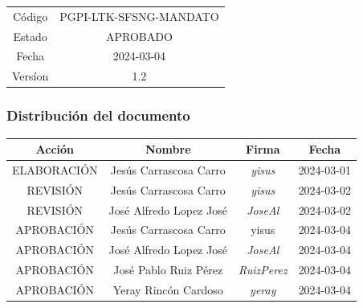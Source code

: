\documentclass[
	a4paper, %
	12pt, %
]{CSSullivanBusinessReport}
\begin{document}
\begin{twothirdswidth}
        \begin{tabular}{cc}
        \toprule
            Código& PGPI-LTK-SFSNG-MANDATO \\
             Estado& APROBADO\\
             Fecha& 2024-03-04 \\
             Versíon& 1.2\\
             \bottomrule
        \end{tabular}
       
    \subsubsection*{Distribución del documento}
        \begin{tabular}{|c|c|c|c|}
        \toprule
         \textbf{Acción} & \textbf{Nombre} &\textbf{Firma} & \textbf{Fecha}\\
         \midrule
         ELABORACIÓN & Jesús Carrascosa Carro & \textit{yisus }& 2024-03-01\\
         \midrule
         REVISIÓN & Jesús Carrascosa Carro & \textit{yisus} & 2024-03-02\\
         REVISIÓN & José Alfredo Lopez José & \textit{JoseAl} & 2024-03-02\\
         \midrule
         APROBACIÓN & Jesús Carrascosa Carro & yisus & 2024-03-04\\
         APROBACIÓN & José Alfredo Lopez José & \textit{JoseAl} & 2024-03-04\\
         APROBACIÓN & José Pablo Ruiz Pérez & \textit{RuizPerez} & 2024-03-04\\
         APROBACIÓN & Yeray Rincón Cardoso & \textit{yeray} & 2024-03-04\\
         \bottomrule
         
        \end{tabular}
\end{twothirdswidth}

\newpage


\begin{twothirdswidth} %
	\tableofcontents %
\end{twothirdswidth}
\end{document}
